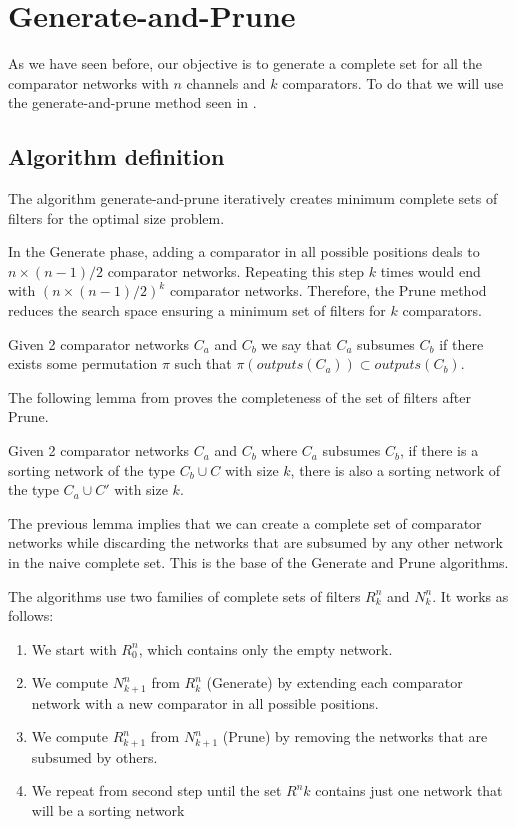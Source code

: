 \documentclass[../main.tex]{subfiles}
\begin{document}
	\section{Generate-and-Prune}
	As we have seen before, our objective is to generate a complete set for all the comparator networks with $n$ channels and $k$ comparators. To do that we will use the generate-and-prune method seen in \cite{sortingnineinputs}.
	
	\subsection{Algorithm definition}
	The algorithm generate-and-prune iteratively creates minimum complete sets of filters for the optimal size problem.
	
	In the Generate phase, adding a comparator in all possible positions deals to $n\times(n-1)/2$ comparator networks. Repeating this step $k$ times would end with $(n\times(n-1)/2)^k$ comparator networks. Therefore, the Prune method reduces the search space ensuring a minimum set of filters for $k$ comparators.
	
	\begin{definition}
		Given 2 comparator networks $C_a$ and $C_b$ we say that $C_a$ subsumes $C_b$ if there exists some permutation $\pi$ such that \newline $\pi (outputs(C_a)) \subset outputs(C_b)$.
	\end{definition}
	
	The following lemma from \cite{sortingnineinputs} proves the completeness of the set of filters after Prune.
	
	\begin{lemma}
		Given 2 comparator networks $C_a$ and $C_b$ where $C_a$ subsumes $C_b$, if there is a sorting network of the type $C_b \cup C$ with size $k$, there is also a sorting network of the type $C_a \cup C'$ with size $k$.
	\end{lemma}

	The previous lemma implies that we can create a complete set of comparator networks while discarding the networks that are subsumed by any other network in the naive complete set. This is the base of the Generate and Prune algorithms.
	
	The algorithms use two families of complete sets of filters $R^n_k$ and $N^n_k$. It works as follows:
	
	\begin{enumerate}
		\item We start with $R^n_0$, which contains only the empty network.
		\item We compute $N^n_{k+1}$ from $R^n_k$ (Generate) by extending each comparator network with a new comparator in all possible positions.
		\item We compute $R^n_{k+1}$ from $N^n_{k+1}$ (Prune) by removing the networks that are subsumed by others.
		\item We repeat from second step until the set $R^{n}{k}$ contains just one network that will be a sorting network
	\end{enumerate}
\end{document}
